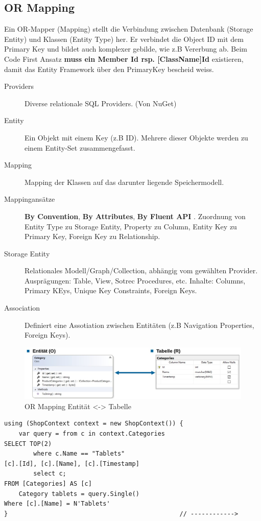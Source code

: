 \documentclass[
a4paper,
oneside,
10pt,
fleqn,
headsepline,
toc=listofnumbered, 
bibliography=totocnumbered]{scrartcl}
\begin{document}
\subsection{OR Mapping}
Ein OR-Mapper (Mapping) stellt die Verbindung zwischen Datenbank (Storage Entity) und Klassen (Entity Type) her. Er verbindet die Object ID mit dem Primary Key und bildet auch komplexer gebilde, wie z.B Vererbung ab. Beim Code First Ansatz \textbf{muss ein Member Id rsp. [ClassName]Id} existieren, damit das Entity Framework über den PrimaryKey bescheid weiss.
\begin{description}
	\item[Providers] Diverse relationale SQL Providers. (Von NuGet)
	\item[Entity] Ein Objekt mit einem Key (z.B ID). Mehrere dieser Objekte werden zu einem Entity-Set zusammengefasst.
	\item[Mapping] Mapping der Klassen auf das darunter liegende Speichermodell.
	\item[Mappingansätze] \textbf{By Convention}, \textbf{By Attributes}, \textbf{By Fluent API} . Zuordnung von Entity Type zu Storage Entity, Property zu Column, Entity Key zu Primary Key, Foreign Key zu Relationship.
	\item[Storage Entity] Relationales Modell/Graph/Collection, abhängig vom gewählten Provider. Ausprägungen: Table, View, Sotrec Procedures, etc. Inhalte: Columns, Primary KEys, Unique Key Constraints, Foreign Keys.
	\item[Association] Definiert eine Assotiation zwischen Entitäten (z.B Navigation Properties, Foreign Keys).
\end{description}

\begin{figure}[ht]
	\centering
	\includegraphics[width=0.8\linewidth]{images/entityframework_or_mapping.png}
	\caption{OR Mapping Entität <-> Tabelle}
	\label{fig:entityframeworkormapping}
\end{figure}
\begin{lstlisting}
using (ShopContext context = new ShopContext()) {
    var query = from c in context.Categories                            SELECT TOP(2)
        where c.Name == "Tablets"                                           [c].[Id], [c].[Name], [c].[Timestamp]
        select c;                                                       FROM [Categories] AS [c]
    Category tablets = query.Single()                                   Where [c].[Name] = N'Tablets'
}                                               // ------------>
\end{lstlisting}
\end{document}
